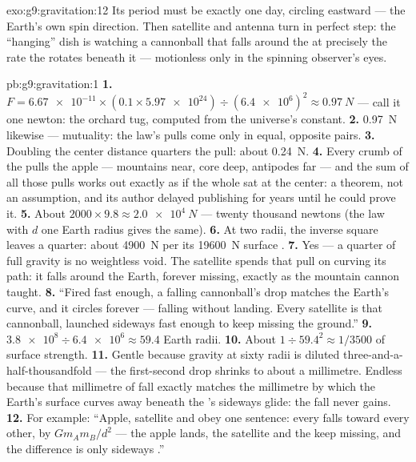 \begin{solution}{exo:g9:gravitation:12}
Its period must be exactly one day, circling eastward --- the
Earth's own spin direction. Then satellite and antenna turn in
perfect step: the ``hanging'' dish is watching a cannonball
that falls around the  at precisely the rate the 
rotates beneath it --- motionless only in the spinning
observer's eyes.
\end{solution}

\begin{solution}{pb:g9:gravitation:1}
\textbf{1.} $F = \num{6.67e-11} \times (0.1 \times
\num{5.97e24}) \div (\num{6.4e6})^2 \approx \qty{0.97}{N}$
--- call it one newton: the orchard tug, computed from the
universe's constant.
\textbf{2.} \qty{0.97}{N} likewise --- mutuality: the law's
pulls come only in equal, opposite pairs.
\textbf{3.} Doubling the center distance quarters the pull:
about \qty{0.24}{N}.
\textbf{4.} Every crumb of the  pulls the apple ---
mountains near, core deep, antipodes far --- and the sum of
all those pulls works out exactly as if the whole  sat at
the center: a theorem, not an assumption, and its author
delayed publishing for years until he could prove it.
\textbf{5.} About $2000 \times 9.8 \approx \qty{2.0e4}{N}$
--- twenty thousand newtons (the law with $d$ one Earth
radius gives the same).
\textbf{6.} At two radii, the inverse square leaves a
quarter: about \qty{4900}{N} per its \qty{19600}{N} surface
.
\textbf{7.} Yes --- a quarter of full gravity is no
weightless void. The satellite spends that pull on curving
its path: it falls around the Earth, forever missing, exactly
as the mountain cannon taught.
\textbf{8.} ``Fired fast enough, a falling cannonball's drop
matches the Earth's curve, and it circles forever ---
falling without landing. Every satellite is that cannonball,
launched sideways fast enough to keep missing the ground.''
\textbf{9.} $\num{3.8e8} \div \num{6.4e6} \approx 59.4$
Earth radii.
\textbf{10.} About $1 \div 59.4^2 \approx 1/3500$ of surface
strength.
\textbf{11.} Gentle because gravity at sixty radii is
diluted three-and-a-half-thousandfold --- the 
first-second drop shrinks to about a millimetre. Endless
because that millimetre of fall exactly matches the
millimetre by which the Earth's surface curves away beneath
the 's sideways glide: the fall never gains.
\textbf{12.} For example: ``Apple, satellite and  obey
one sentence: every  falls toward every other, by
$G m_A m_B / d^2$ --- the apple lands, the satellite and the
 keep missing, and the difference is only sideways
.''
\end{solution}
